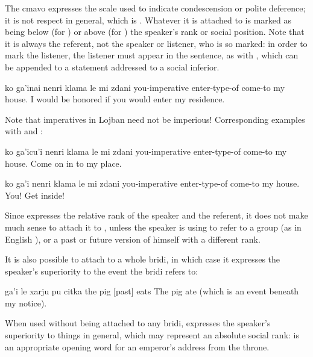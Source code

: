 The cmavo  expresses the scale used to indicate
    condescension or polite deference; it is not respect in
    general, which is . Whatever it is attached to is marked
    as being below (for ) or above (for ) the
    speaker's rank or social position. Note that it is always the
    referent, not the speaker or listener, who is so marked: in
    order to mark the listener, the listener must appear in the
    sentence, as with , which can be appended to a
    statement addressed to a social inferior.
\begin{example}
ko ga'inai\n
\T	nenri klama le mi zdani\n
you-imperative \n
\T	enter-type-of come-to my house.\n
I would be honored if you would enter my residence.
\end{example}

Note that imperatives in Lojban need not be imperious!
    Corresponding examples with  and :
\begin{example}
ko ga'icu'i\n
\T	nenri klama le mi zdani\n
you-imperative \n
\T	enter-type-of come-to my house.\n
Come on in to my place.
\end{example}

\begin{example}
ko ga'i\n
\T	nenri klama le mi zdani\n
you-imperative \n
\T	enter-type-of come-to my house.\n
You! Get inside!
\end{example}

Since  expresses the relative rank of the speaker
    and the referent, it does not make much sense to attach it to
    , unless the speaker is using  to refer to a group
    (as in English ), or a past or future version of himself
    with a different rank.

It is also possible to attach  to a whole bridi, in
    which case it expresses the speaker's superiority to the event
    the bridi refers to:
\begin{example}
ga'i le xarju pu citka\n
{} the pig [past] eats\n
The pig ate (which is an event beneath my notice).
\end{example}

When used without being attached to any bridi, 
    expresses the speaker's superiority to things in general, which
    may represent an absolute social rank:  is an
    appropriate opening word for an emperor's address from the
    throne. 

